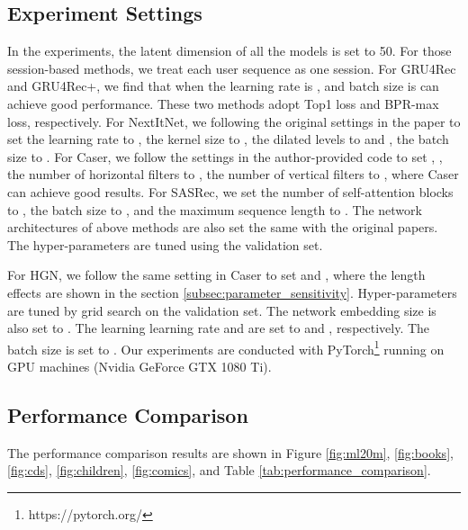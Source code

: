 \documentclass[sigconf]{acmart}
\begin{document}
\subsection{Experiment Settings}
In the experiments, the latent dimension of all the models is set to 50. For those session-based methods, we treat each user sequence as one session. For GRU4Rec and GRU4Rec+, we find that when the learning rate is , and batch size is  can achieve good performance. These two methods adopt Top1 loss and BPR-max loss, respectively. For NextItNet, we following the original settings in the paper to set the learning rate to , the kernel size to , the dilated levels to  and , the batch size to . For Caser, we follow the settings in the author-provided code to set , , the number of horizontal filters to , the number of vertical filters to , where Caser can achieve good results. For SASRec, we set the number of self-attention blocks to , the batch size to , and the maximum sequence length to . The network architectures of above methods are also set the same with the original papers. The hyper-parameters are tuned using the validation set.

For HGN, we follow the same setting in Caser to set  and , where the length effects are shown in the section \ref{subsec:parameter_sensitivity}. Hyper-parameters are tuned by grid search on the validation set. The network embedding size  is also set to . The learning learning rate and  are set to  and , respectively. The batch size is set to . Our experiments are conducted with PyTorch\footnote{https://pytorch.org/} running on GPU machines (Nvidia GeForce GTX 1080 Ti).

\subsection{Performance Comparison}
The performance comparison results are shown in Figure \ref{fig:ml20m}, \ref{fig:books}, \ref{fig:cds}, \ref{fig:children}, \ref{fig:comics}, and Table \ref{tab:performance_comparison}. 
\end{document}
